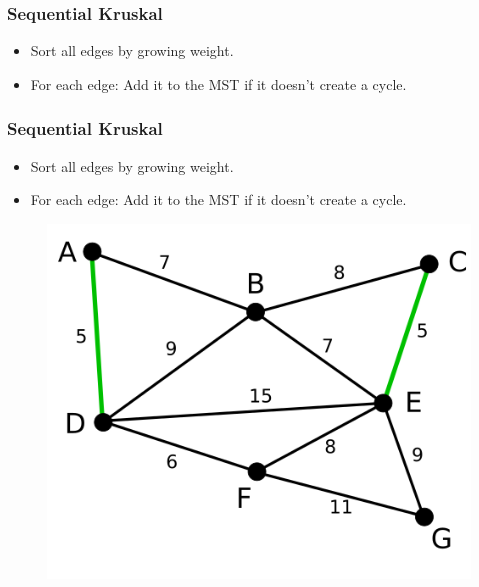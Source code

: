 \documentclass{beamer}
\begin{document}
\begin{frame}
    \frametitle{Sequential Kruskal}
    \begin{itemize}
        \item Sort all edges by growing weight.
        \item For each edge: Add it to the MST if it doesn't create a cycle.
    \end{itemize}


\end{frame}

\begin{frame}
    \frametitle{Sequential Kruskal}
    \begin{itemize}
        \item Sort all edges by growing weight.
        \item For each edge: Add it to the MST if it doesn't create a cycle.
    \end{itemize}

    \begin{figure}
        \includegraphics[width=.5\textwidth]{kruskal_2.png}
    \end{figure}

\end{frame}
\end{document}
